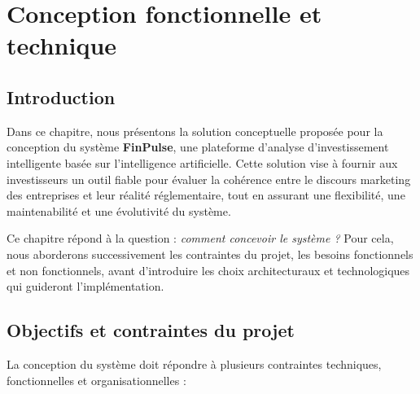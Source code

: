 \chapter{Conception fonctionnelle et technique}

\section{Introduction}

Dans ce chapitre, nous présentons la solution conceptuelle proposée pour la conception
du système \textbf{FinPulse}, une plateforme d'analyse d'investissement intelligente basée
sur l'intelligence artificielle. Cette solution vise à fournir aux investisseurs un outil
fiable pour évaluer la cohérence entre le discours marketing des entreprises et leur
réalité réglementaire, tout en assurant une flexibilité, une maintenabilité et une
évolutivité du système.

Ce chapitre répond à la question : \textit{comment concevoir le système ?} Pour cela,
nous aborderons successivement les contraintes du projet, les besoins fonctionnels et
non fonctionnels, avant d'introduire les choix architecturaux et technologiques qui
guideront l'implémentation.

\section{Objectifs et contraintes du projet}

La conception du système doit répondre à plusieurs contraintes techniques,
fonctionnelles et organisationnelles :


